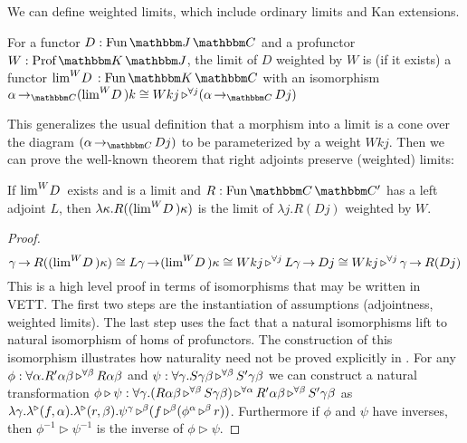 \documentclass{llncs}
\begin{document}
\noindent We can define weighted limits, which include ordinary limits and
Kan extensions.
\begin{definition}
  For a functor $D : \varr {\cat J}{\cat C}$ and a profunctor $W :
  \harr{\cat K}{\cat J}$, the limit of $D$ weighted by $W$ is (if it
  exists) a functor $\weightedLimitDW D W : \varr{\cat K}{\cat C}$
  with an isomorphism $\punitinXfromYtoZ {\cat C} {\alpha} {(\weightedLimitDW D W) k} \cong \homrallXYtoZ j {W k j} {(\punitinXfromYtoZ {\cat C} \alpha {D j})}$
\end{definition}
This generalizes the usual definition that a morphism into a limit is
a cone over the diagram $(\punitinXfromYtoZ {\cat C} \alpha {D j})$ to
be parameterized by a weight $W k j$.
Then we can prove the well-known theorem that right adjoints preserve (weighted) limits:
\begin{theorem}
  If $\weightedLimitDW D W$ exists and is a limit and $R : \varr{\cat
    C}{\cat C'}$ has a left adjoint $L$, then $\lambda
  \kappa. R((\weightedLimitDW D W) \kappa)$ is the limit of $\lambda
  j. R(D j)$ weighted by $W$.
\end{theorem}
\begin{proof}
\[
    \punitinXfromYtoZ {} {\gamma} {R ((\weightedLimitDW D W) \kappa)}
    \cong \punitinXfromYtoZ {}{L \gamma} {(\weightedLimitDW D W) \kappa}
    \cong \homrallXYtoZ {j}{W k j} {\punitinXfromYtoZ {}{L \gamma}{D j}}
    \cong \homrallXYtoZ {j}{W k j} {\punitinXfromYtoZ {}{\gamma}{R(D j)}}\\
\]
This is a high level proof in terms of isomorphisms that may be written
in VETT. The first two steps are the instantiation of assumptions
(adjointness, weighted limits). The last step uses the fact that a
natural isomorphisms lift to natural isomorphism of homs of profunctors.
The construction of this isomorphism illustrates how naturality need not
be proved explicitly in \vett{}.  For any $\phi: \homunary \alpha {R'
  \alpha \beta} \beta {R \alpha \beta}$ and $\psi : \homunary \gamma {S
  \gamma \beta} \beta {S' \gamma \beta}$ we can construct a natural
transformation $\phi \triangleright \psi : \hombinary \gamma
{(\homrallXYtoZ \beta {R \alpha \beta}{S \gamma \beta})} {\alpha}
{R'\alpha\beta} \beta {S'\gamma\beta}$ as \\ $\lambdabinary {\gamma} {f}
{\alpha} r \beta {\appunary \psi \gamma {(\homrappXtoYatZ f {(\appunary
      \phi \alpha r \beta)} \beta)} \beta}$. Furthermore if $\phi$ and
$\psi$ have inverses, then $\phi^{-1} \triangleright \psi^{-1}$ is the
inverse of $\phi \triangleright \psi$.
\end{proof}
\end{document}
